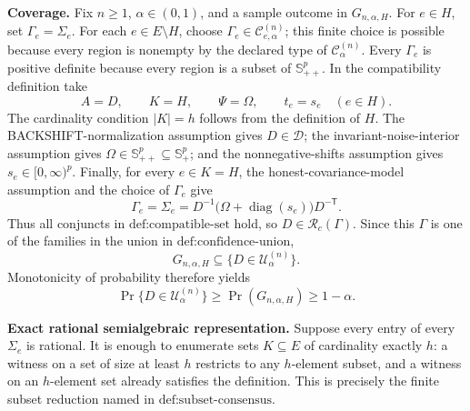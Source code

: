 \textbf{Coverage.}
Fix \(n\geq 1\), \(\alpha\in(0,1)\), and a sample outcome in \(G_{n,\alpha,H}\).  For \(e\in H\), set \(\Gamma_e=\Sigma_e\).  For each \(e\in E\setminus H\), choose \(\Gamma_e\in\mathcal C^{(n)}_{e,\alpha}\); this finite choice is possible because every region is nonempty by the declared type of \(\mathcal C^{(n)}_\alpha\).  Every \(\Gamma_e\) is positive definite because every region is a subset of \(\mathbb S_{++}^p\).  In the compatibility definition take
\[
 A=D,\qquad K=H,\qquad \Psi=\Omega,\qquad t_e=s_e\quad(e\in H).
\]
The cardinality condition \(|K|=h\) follows from the definition of \(H\).  The BACKSHIFT-normalization assumption gives \(D\in\mathcal D\); the invariant-noise-interior assumption gives \(\Omega\in\mathbb S_{++}^p\subseteq\mathbb S_+^p\); and the nonnegative-shifts assumption gives \(s_e\in[0,\infty)^p\).  Finally, for every \(e\in K=H\), the honest-covariance-model assumption and the choice of \(\Gamma_e\) give
\[
 \Gamma_e=\Sigma_e
 =D^{-1}\bigl(\Omega+\operatorname{diag}(s_e)\bigr)D^{-\mathsf T}.
\]
Thus all conjuncts in \(\text{def:compatible-set}\) hold, so \(D\in\mathcal R_c(\Gamma)\).  Since this \(\Gamma\) is one of the families in the union in \(\text{def:confidence-union}\),
\[
 G_{n,\alpha,H}\subseteq\{D\in\mathcal U^{(n)}_\alpha\}.
\]
Monotonicity of probability therefore yields
\[
 \Pr\{D\in\mathcal U^{(n)}_\alpha\}
 \geq \Pr(G_{n,\alpha,H})\geq 1-\alpha.
\]

\textbf{Exact rational semialgebraic representation.}
Suppose every entry of every \(\Sigma_e\) is rational.  It is enough to enumerate sets \(K\subseteq E\) of cardinality exactly \(h\): a witness on a set of size at least \(h\) restricts to any \(h\)-element subset, and a witness on an \(h\)-element set already satisfies the definition.  This is precisely the finite subset reduction named in \(\text{def:subset-consensus}\).

